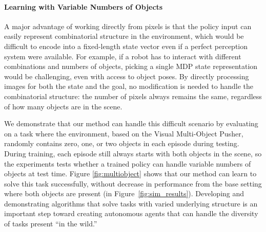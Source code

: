 \documentclass{article}
\begin{document}
\paragraph{Learning with Variable Numbers of Objects}
A major advantage of working directly from pixels is that the policy input can easily represent combinatorial structure in the environment, which would be difficult to encode into a fixed-length state vector even if a perfect perception system were available.
For example, if a robot has to interact with different combinations and numbers of objects, picking a single MDP state representation would be challenging, even with access to object poses.
By directly processing images for both the state and the goal, no modification is needed to handle the combinatorial structure: the number of pixels always remains the same, regardless of how many objects are in the scene.

We demonstrate that our method can handle this difficult scenario by evaluating on a task where the environment, based on the Visual Multi-Object Pusher, randomly contains zero, one, or two objects in each episode during testing.
During training, each episode still always starts with both objects in the scene, so the experiments tests whether a trained policy can handle variable numbers of objects at test time.
Figure \ref{fig:multiobject} shows that our method can learn to solve this task successfully, without decrease in performance from the base setting where both objects are present (in Figure~\ref{fig:sim_results}).
Developing and demonstrating algorithms that solve tasks with varied underlying structure is an important step toward creating autonomous agents that can handle the diversity of tasks present ``in the wild.''
\end{document}
